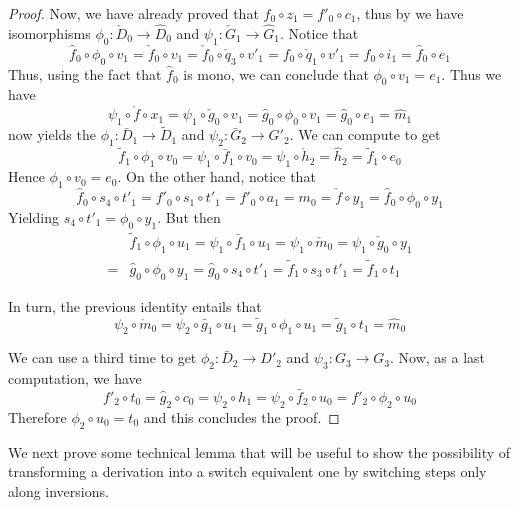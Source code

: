 \documentclass[a4paper,UKenglish,cleveref,pdftex,thm-restate,numberwithinsect]{lipics-v2021}
\begin{document}
\begin{proof}
	Now, we have already proved that $f_0\circ z_1=f'_0\circ c_1$, thus by  we have isomorphisms $\phi_{0}\colon \check{D}_0\to \hat{D}_0$ and $\psi_{1}\colon \check{G}_1\to \hat{G}_1$.
	Notice that
	\[
	\hat{f}_0\circ \phi_{0}\circ v_1  = \check{f}_0\circ v_1 =\check{f}_0\circ \check{q}_3\circ v'_1=f_0\circ \check{q}_1\circ v'_1=f_0\circ i_1=\hat{f}_0\circ e_1\]
Thus, using the fact that $\hat{f}_0$ is mono, we can conclude that $\phi_0\circ v_1=e_1$. Thus we have
\[\psi_1\circ \mathring{f}\circ x_1=\psi_1\circ \check{g}_0\circ v_1= \hat{g}_0\circ \phi_0\circ v_1=\hat{g}_0\circ e_1=\hat{m}_1 \]
	  now yields the $\phi_1\colon \bar{D}_1\to\tilde{D}_1$ and $\psi_2\colon \bar{G}_2\to G'_2$.  We can compute to get
	 \[
	 \tilde{f}_1\circ \phi_1\circ v_0=\psi_1\circ \bar{f}_1\circ v_0=\psi_1\circ \mathring{h}_2=\hat{h}_2=\tilde{f}_1\circ e_0\]
	 Hence $\phi_1\circ v_0=e_0$. On the other hand, notice that
	 \[\hat{f}_0\circ s_4\circ t'_1=f'_0\circ s_1\circ t'_1=f'_0\circ a_1=m_0=\check{f}\circ y_1=\hat{f}_0\circ \phi_0\circ y_1\]
	 Yielding $s_4\circ t'_1=\phi_0\circ y_1$. But then
	 \begin{align*}
&\tilde{f}_1\circ \phi_1\circ u_1=\psi_1\circ \bar{f}_1\circ u_1=\psi_1\circ \check{m}_0= \psi_1\circ \check{g}_0\circ y_1\\=&\hat{g}_0\circ \phi_0\circ y_1=\hat{g}_0\circ s_4\circ t'_1=\tilde{f}_1\circ s_3\circ t'_1=\tilde{f}_1\circ t_1 
	 \end{align*}
	 
	 In turn, the previous identity entails that
	\[\psi_2\circ \mathring{m}_0=\psi_2\circ \bar{g}_1\circ u_1 = \tilde{g}_1\circ \phi_1\circ u_1 = \tilde{g}_1\circ t_1=\hat{m}_0\]
	
	We can use  a third time to get $\phi_2\colon \bar{D}_2\to D'_2$ and $\psi_3\colon G_3\to G_3$.  Now, as a last computation, we have
	\[f'_2\circ t_0= \hat{g}_2\circ c_0=\psi_2\circ h_1=\psi_2\circ \bar{f}_2\circ u_0=f'_2\circ \phi_2\circ u_0\]
	Therefore $\phi_2\circ u_0=t_0$ and this concludes the proof.
\end{proof}


We next prove some technical lemma that will be useful to show the
possibility of transforming a derivation into a switch equivalent one
by switching steps only along inversions.
\end{document}

